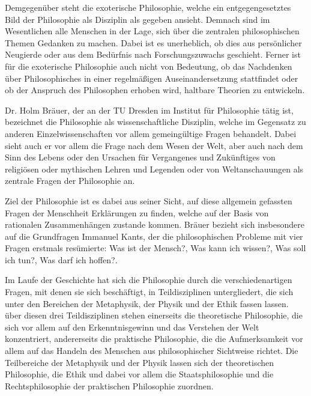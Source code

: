 Demgegenüber steht die exoterische Philosophie, welche ein entgegengesetztes Bild der Philosophie als Disziplin als gegeben ansieht. 
Demnach sind im Wesentlichen alle Menschen in der Lage, sich über die zentralen philosophischen Themen Gedanken zu machen. 
Dabei ist es unerheblich, ob dies aus persönlicher Neugierde oder aus dem Bedürfnis nach Forschungszuwachs geschieht. 
Ferner ist für die exoterische Philosophie auch nicht von Bedeutung, ob das Nachdenken über Philosophisches in einer regelmäßigen Auseinandersetzung stattfindet oder ob der Anspruch des Philosophen erhoben wird, haltbare Theorien zu entwickeln\cite[S.\,8]{BB10}.

Dr. Holm Bräuer, der an der TU Dresden im Institut für Philosophie tätig ist, bezeichnet die Philosophie als wissenschaftliche Disziplin, welche im Gegensatz zu anderen Einzelwissenschaften vor allem gemeingültige Fragen behandelt.
 Dabei sieht auch er vor allem die Frage nach dem Wesen der Welt, aber auch nach dem Sinn des Lebens oder den Ursachen für \glqq Vergangenes und Zukünftiges von religiösen oder mythischen Lehren und Legenden oder von Weltanschauungen\grqq{}\cite{PL16} als zentrale Fragen der Philosophie an.

 Ziel der Philosophie ist es dabei aus seiner Sicht, auf diese allgemein gefassten Fragen der Menschheit Erklärungen zu finden, welche auf der Basis von rationalen Zusammenhängen zustande kommen.
  Bräuer bezieht sich insbesondere auf die Grundfragen Immanuel Kants, der die philosophischen Probleme mit vier Fragen erstmals resümierte: \glqq Was ist der Mensch?\grqq{}, \glqq Was kann ich wissen?\grqq{}, \glqq Was soll ich tun?\grqq{}, \glqq Was darf ich hoffen?\grqq{}.  
  
Im Laufe der Geschichte hat sich die Philosophie durch die verschiedenartigen Fragen, mit denen sie sich beschäftigt, in Teildisziplinen untergliedert, die sich unter den Bereichen der Metaphysik, der Physik und der Ethik fassen lassen. 
über diesen drei Teildisziplinen stehen einerseits die theoretische Philosophie, die sich vor allem auf den Erkenntnisgewinn und das Verstehen der Welt konzentriert, andererseits die praktische Philosophie, die die Aufmerksamkeit vor allem auf das Handeln des Menschen aus philosophischer Sichtweise richtet. 
Die Teilbereiche der Metaphysik und der Physik lassen sich der theoretischen Philosophie, die Ethik und dabei vor allem die Staatsphilosophie und die Rechtsphilosophie der praktischen Philosophie zuordnen. 

